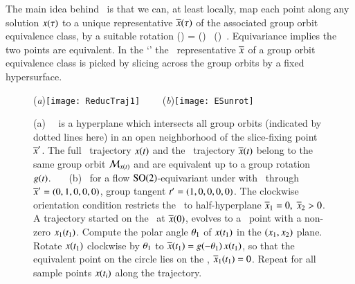 The main idea behind \mframes\ is that we can, at least locally,
map each point along any solution $x(\tau)$ to a unique
representative $\overline{x}(\tau)$ of the associated
group orbit equivalence class, by a suitable rotation
\beq
\ssp(\tau) = \LieEl(\tau) \, \sspRed(\tau)
\,.
Equivariance implies the two points are equivalent.
In the `\mframes' the \reducedsp\ representative $\overline{x}$
of a group orbit equivalence class is picked by slicing across the group orbits
by a fixed hypersurface.
%
\begin{figure}[ht] \label{fig:ReducTraj}
\begin{center}
(\textit{a})\texttt{[image: ReducTraj1]}
~~~~(\textit{b})\texttt{[image: ESunrot]}
\end{center}
\caption{
(a)
\Slice\ \pSRed\ is a hyperplane  which intersects
all
group orbits (indicated by dotted lines here) in an open
neighborhood of the slice-fixing point ${\overline{x}'}$. The full
\statesp\ trajectory $x(t)$ and the \reducedsp\
trajectory $\overline{x}(t)$ belong to the same group orbit
${\cal M}_{x(t)}$ and are equivalent up to a group rotation
$g(t)$.
~~~(b)
\Mframes\ for a flow $\textrm{SO}(2)$-equivariant under
 with \slice\ through ${\overline{x}'}=(0,1,0,0,0)$,
group tangent $t'_{}=(1,0,0,0,0)$. The clockwise
orientation condition restricts the \slice\ to half-hyperplane
$\overline{x}_1=0,\;\overline{x}_2>0$. A trajectory started on the
\slice\ at $\overline{x}(0)$, evolves to a \statesp\ point with a
non-zero $x_1(t_1)$. Compute the polar angle ${\bf \theta}_1$
of $x(t_1)$ in the $(x_1,x_2)$ plane. Rotate $x(t_1)$
clockwise by ${\bf \theta}_1$ to $\overline{x}(t_1) =
g(-{\bf \theta}_1)\,x(t_1)$, so that the equivalent point
on the circle lies on the \slice, $\overline{x}_1(t_1) =0$. Repeat
for all sample points $x(t_i)$ along the trajectory.
}
\end{figure}
%

